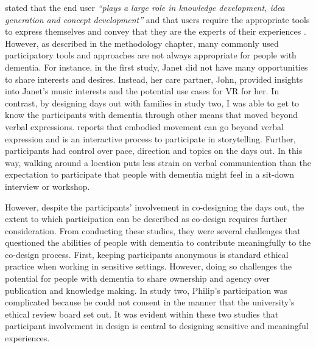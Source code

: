 \cite{sanders2008co} stated that the end user \textit{``plays a large role in knowledge development, idea generation and concept development''} and that users require the appropriate tools to express themselves and convey that they are the experts of their experiences \citep{visser2005contextmapping}. However, as described in the methodology chapter, many commonly used participatory tools and approaches are not always appropriate for people with dementia. For instance, in the first study, Janet did not have many opportunities to share interests and desires. Instead, her care partner, John, provided insights into Janet's music interests and the potential use cases for VR for her. In contrast, by designing days out with families in study two, I was able to get to know the participants with dementia through other means that moved beyond verbal expressions. \cite{hyden2013storytelling} reports that embodied movement can go beyond verbal expression and is an interactive process to participate in storytelling. Further, participants had control over pace, direction and topics on the days out. In this way, walking around a location puts less strain on verbal communication than the expectation to participate that people with dementia might feel in a sit-down interview or workshop. 

However, despite the participants' involvement in co-designing the days out, the extent to which participation can be described as co-design requires further consideration. From conducting these studies, they were several challenges that questioned the abilities of people with dementia to contribute meaningfully to the co-design process. First, keeping participants anonymous is standard ethical practice when working in sensitive settings. However, doing so challenges the potential for people with dementia to share ownership and agency over publication and knowledge making. In study two, Philip's participation was complicated because he could not consent in the manner that the university's ethical review board set out. It was evident within these two studies that participant involvement in design is central to designing sensitive and meaningful experiences. 

